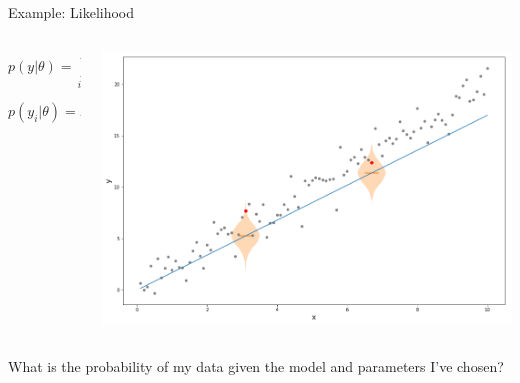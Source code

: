 \documentclass[12pt, aspectratio=149]{beamer}
\theoremstyle{plain}
\begin{document}
\begin{frame}[fragile]{Example: Likelihood}
\begin{columns}
	\begin{column}{0.3\linewidth}
		\begin{equation*}
		p(y|\theta) = \prod_{i=1}^n p(y_i|\theta)
		\end{equation*}
		
		\begin{equation*}
		p(y_i|\theta) = N(y_i|\theta x_i, \sigma^2)
		\end{equation*}
	\end{column}
		
	\begin{column}{0.7\textwidth}
		\begin{center}
			\includegraphics[scale=0.7]{figs/linreg_likelihood_calc_example.png}
		\end{center}
	\end{column}


\end{columns}
  
\vspace{0.5cm}
What is the probability of my data given the model and parameters I've chosen? 

\end{frame}
\end{document}
